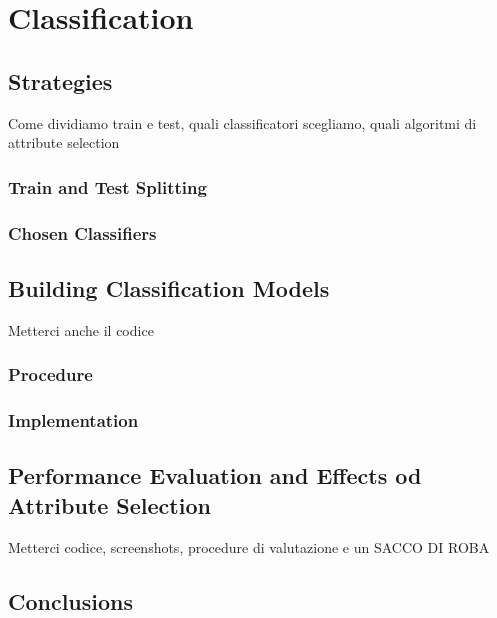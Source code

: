 \section{Classification}

\subsection{Strategies}
Come dividiamo train e test, quali classificatori scegliamo, quali algoritmi di attribute selection

\subsubsection{Train and Test Splitting}

\subsubsection{Chosen Classifiers}

\subsection{Building Classification Models}
Metterci anche il codice

\subsubsection{Procedure}

\subsubsection{Implementation}

\subsection{Performance Evaluation and Effects od Attribute Selection}
Metterci codice, screenshots, procedure di valutazione e un SACCO DI ROBA

\subsection{Conclusions}